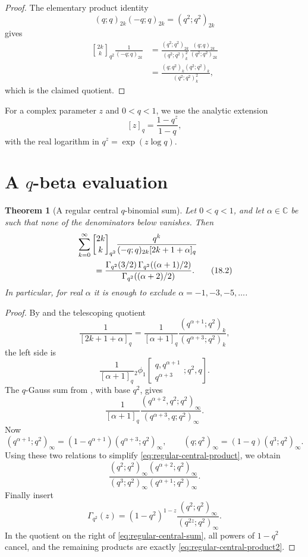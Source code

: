 \documentclass[11pt,oneside,openany]{book}
\newtheorem{theorem}{Theorem}[chapter]
\theoremstyle{definition}
\theoremstyle{remark}
\newcommand{\Qbinom}[3]{\genfrac{[}{]}{0pt}{}{#1}{#2}_{#3}}
\newcommand{\C}{\mathbb C}
\begin{document}
\begin{proof}
The elementary product identity
\[
 (q;q)_{2k}(-q;q)_{2k}=(q^2;q^2)_{2k}
\]
gives
\begin{align*}
 \Qbinom{2k}{k}{q^2}\frac1{(-q;q)_{2k}}
 &=\frac{(q^2;q^2)_{2k}}{(q^2;q^2)_k^2}
   \frac{(q;q)_{2k}}{(q^2;q^2)_{2k}}\\
 &=\frac{(q;q^2)_k(q^2;q^2)_k}{(q^2;q^2)_k^2},
\end{align*}
which is the claimed quotient.
\end{proof}

For a complex parameter $z$ and $0<q<1$, we use the analytic extension
\[
 [z]_q=\frac{1-q^z}{1-q},
\]
with the real logarithm in $q^z=\exp(z\log q)$.

\section{A \texorpdfstring{$q$}{q}-beta evaluation}

\begin{theorem}[A regular central $q$-binomial sum]\label{thm:regular-central-sum}
Let $0<q<1$, and let $\alpha\in\C$ be such that none of the denominators below vanishes.  Then
\begin{align}
 &\sum_{k=0}^{\infty}
 \Qbinom{2k}{k}{q^2}
 \frac{q^k}{(-q;q)_{2k}[2k+1+\alpha]_q}
 \notag\\
 &\qquad=
 \frac{\Gamma_{q^2}(3/2)\,
       \Gamma_{q^2}((\alpha+1)/2)}
      {\Gamma_{q^2}((\alpha+2)/2)}.
 \tag{18.2}\label{eq:regular-central-sum}
\end{align}
In particular, for real $\alpha$ it is enough to exclude
$\alpha=-1,-3,-5,\ldots$.
\end{theorem}

\begin{proof}
By  and the telescoping quotient
\[
 \frac1{[2k+1+\alpha]_q}
 =\frac1{[\alpha+1]_q}
   \frac{(q^{\alpha+1};q^2)_k}
        {(q^{\alpha+3};q^2)_k},
\]
the left side is
\[
 \frac1{[\alpha+1]_q}
 {}_2\phi_1\!\left[
 \begin{matrix}q,q^{\alpha+1}\\q^{\alpha+3}\end{matrix};
 q^2,q\right].
\]
The $q$-Gauss sum from , with base $q^2$, gives
\[
 \frac1{[\alpha+1]_q}
 \frac{(q^{\alpha+2},q^2;q^2)_\infty}
      {(q^{\alpha+3},q;q^2)_\infty}.
 \tag{18.3}\label{eq:regular-central-product}
\]
Now
\[
 (q^{\alpha+1};q^2)_\infty
 =(1-q^{\alpha+1})(q^{\alpha+3};q^2)_\infty,
 \qquad
 (q;q^2)_\infty=(1-q)(q^3;q^2)_\infty.
\]
Using these two relations to simplify \eqref{eq:regular-central-product}, we obtain
\[
 \frac{(q^2;q^2)_\infty(q^{\alpha+2};q^2)_\infty}
 {(q^3;q^2)_\infty(q^{\alpha+1};q^2)_\infty}.
 \tag{18.4}\label{eq:regular-central-product2}
\]
Finally insert
\[
 \Gamma_{q^2}(z)
 =(1-q^2)^{1-z}
 \frac{(q^2;q^2)_\infty}{(q^{2z};q^2)_\infty}.
\]
In the quotient on the right of \eqref{eq:regular-central-sum}, all powers of $1-q^2$ cancel, and the remaining products are exactly \eqref{eq:regular-central-product2}.
\end{proof}
\end{document}
